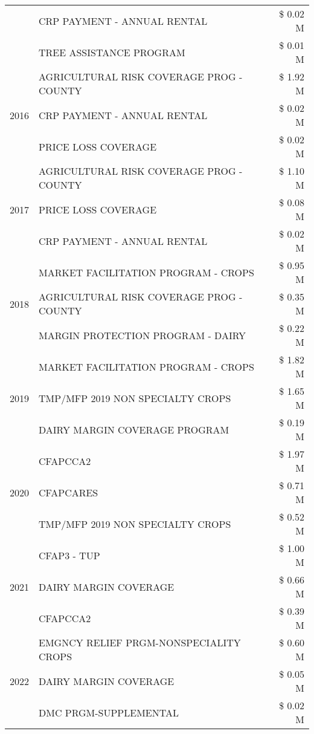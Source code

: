 \begin{tabular}{llr}
 & CRP PAYMENT - ANNUAL RENTAL & \$ 0.02 M \\
 & TREE ASSISTANCE PROGRAM & \$ 0.01 M \\
\cline{1-3}
\multirow[t]{3}{*}{2016} & AGRICULTURAL RISK COVERAGE PROG - COUNTY & \$ 1.92 M \\
 & CRP PAYMENT - ANNUAL RENTAL & \$ 0.02 M \\
 & PRICE LOSS COVERAGE & \$ 0.02 M \\
\cline{1-3}
\multirow[t]{3}{*}{2017} & AGRICULTURAL RISK COVERAGE PROG - COUNTY & \$ 1.10 M \\
 & PRICE LOSS COVERAGE & \$ 0.08 M \\
 & CRP PAYMENT - ANNUAL RENTAL & \$ 0.02 M \\
\cline{1-3}
\multirow[t]{3}{*}{2018} & MARKET FACILITATION PROGRAM - CROPS & \$ 0.95 M \\
 & AGRICULTURAL RISK COVERAGE PROG - COUNTY & \$ 0.35 M \\
 & MARGIN PROTECTION PROGRAM - DAIRY & \$ 0.22 M \\
\cline{1-3}
\multirow[t]{3}{*}{2019} & MARKET FACILITATION PROGRAM - CROPS & \$ 1.82 M \\
 & TMP/MFP 2019 NON SPECIALTY CROPS & \$ 1.65 M \\
 & DAIRY MARGIN COVERAGE PROGRAM & \$ 0.19 M \\
\cline{1-3}
\multirow[t]{3}{*}{2020} & CFAPCCA2 & \$ 1.97 M \\
 & CFAPCARES & \$ 0.71 M \\
 & TMP/MFP 2019 NON SPECIALTY CROPS & \$ 0.52 M \\
\cline{1-3}
\multirow[t]{3}{*}{2021} & CFAP3 - TUP & \$ 1.00 M \\
 & DAIRY MARGIN COVERAGE & \$ 0.66 M \\
 & CFAPCCA2 & \$ 0.39 M \\
\cline{1-3}
\multirow[t]{3}{*}{2022} & EMGNCY RELIEF PRGM-NONSPECIALITY CROPS & \$ 0.60 M \\
 & DAIRY MARGIN COVERAGE & \$ 0.05 M \\
 & DMC PRGM-SUPPLEMENTAL & \$ 0.02 M \\
\cline{1-3}
\bottomrule
\end{tabular}
